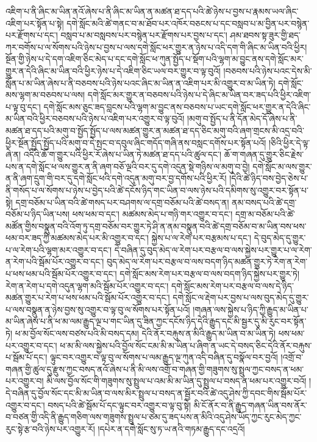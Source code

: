 འཇིག་པ་ནི་ཞིང་མ་ཡིན་ནའོ་ཞེས་པ་ནི་ཞིང་མ་ཡིན་ན་མཚན་ཐ་དད་པའི་ཚེ་ཉེས་པ་བྱས་པ་རྣམས་ཡལ་ཞིང་འཇིག་པར་སྟོན་པ་སྟེ། དགེ་སློང་མའི་ཚེ་གནང་བ་མ་ཐོབ་པར་འཁོར་བཅངས་པ་དང་བསླབ་པ་མ་བྱིན་པར་བསྙེན་པར་རྫོགས་པ་དང་། བསླབ་པ་མ་བསླབས་པར་བསྙེན་པར་རྫོགས་པར་བྱས་པ་དང་། ཤམ་ཐབས་སྟ་ཟུར་གྱི་ཐད་ཀར་བགོས་པ་ལ་སོགས་པའི་ཉེས་པ་བྱས་པ་ལས་དགེ་སློང་ཕར་གྱུར་ན་ཉེས་པ་འདི་དག་གི་ཞིང་མ་ཡིན་བའི་ཕྱིར། སྔོན་གྱི་ཉེས་པ་དེ་དག་འཇིག་ཅིང་མེད་པ་དང་དགེ་སློང་ཕ་ཀུན་སྤྱོད་པ་སྡོག་པའི་ལྷག་མ་བྱུང་ནས་དགེ་སློང་མར་གྱུར་ན་དེའི་ཞིང་མ་ཡིན་བའི་ཕྱིར་ཉེས་པ་དེ་འཇིག་ཅིང་ཡལ་བར་གྱུར་བ་ལྟ་བུའོ། །བཅབས་པའི་ཉེས་པའང་དེས་མི་སློན་པ་མ་ཡིན་ཞེས་པ་ནི་བཅབས་པའི་ཉེས་པའང་ཞིང་མ་ཡིན་ན་འཇིག་པར་མི་འགྱུར་བ་མ་ཡིན་ཏེ། དགེ་སློང་མས་ལྷག་མ་བཅབས་པ་ལས། དགེ་སློང་མར་གྱུར་ན་བཅབས་པའི་ཉེས་པ་དེ་ཞིང་མ་ཡིན་བར་ཟད་པའི་ཕྱིར་འཇིག་པ་ལྟ་བུ་དང་། དགེ་སློང་མས་ཅུང་ཟད་བླངས་པའི་ལྷག་མ་བྱུང་ནས་བཅབས་པ་ཡང་དགེ་སློང་ཕར་གྱུར་ན་དེའི་ཞིང་མ་ཡིན་བའི་ཕྱིར་བཅབས་པའི་ཉེས་པ་འཇིག་པར་འགྱུར་བ་ལྟ་བུའོ། །མགུ་བ་སྤྱོད་པ་ནི་དོན་མེད་དོ་ཞེས་པ་ནི་མཚན་ཐ་དད་པའི་མགུ་བ་སྤྱོད་སྤྱོད་པ་ལས་མཚན་གྱུར་ན་མཚན་ཐ་དད་ཅིང་མགུ་བའི་ཞག་གྲངས་མི་འདྲ་བའི་ཕྱིར་སྔོན་སྤྱོད་སྤྱོད་པའི་མགུ་བ་དེ་སྤང་བ་དབུལ་ཞིང་གདོད་གཞི་ནས་བསླང་དགོས་པར་སྟོན་པའོ། །ཅིའི་ཕྱིར་དེ་ལྟ་ཞེ་ན། འདིའི་ཆོ་ག་གྱུར་པའི་ཕྱིར་རོ་ཞེས་པ་ཡིན་ཏེ་མཚན་ཐ་དད་པའི་ཚུལ་དང་། ཆོ་ག་གཞན་དུ་གྱུར་ཅིང་རྗེས་པས་ན་དགེ་སློང་ཕ་ལས་གྱུར་ན་ནི་ཞག་བཅོ་ལྔའི་བར་དུ་དགེ་འདུན་སྡེ་གཉིས་ལ་མགུ་བ་བྱེ། དགེ་སློང་མ་ལས་གྱུར་ན་ནི་ཞག་དྲུག་གི་བར་དུ་དགེ་སློང་ཕའི་དགེ་འདུན་མགུ་བར་བྱ་དགོས་པའི་ཕྱིར་རོ། །དེའི་ཚེ་ཉིད་བས་བྱེད་ཅེས་པ་ནི་གསོད་པ་ལ་སོགས་པ་ཉེས་པ་བྱེད་པའི་ཚེ་དངོས་ཉིད་གང་ཡིན་བ་ལས་ཉེས་པའི་དམིགས་སུ་འགྱུར་བར་སྟོན་པ་སྟེ། དགྲ་བཅོམ་པ་ཡིན་བའི་ཚེ་གསད་པར་བཤགས་ལ་དགྲ་བཅོམ་པའི་ཚེ་བསད་ན། ནམ་བསད་པའི་ཚེ་དགྲ་བཅོམ་པ་ཉིད་ཡིན་པས། ཕས་ཕམ་བ་དང་། མཚམས་མེད་པ་གཉི་གར་འགྱུར་བ་དང་། དགྲ་མ་བཅོམ་པའི་ཚེ་མཚོན་གྱིས་བསྣུན་བའི་འོག་ཏུ་དགྲ་བཅོམ་བར་གྱུར་ཏེ་ཤི་ན་ནམ་བསྣུན་བའི་ཚེ་དགྲ་བཅོམ་བ་མ་ཡིན་བས་ཕས་ཕམ་བར་ཟད་ཀྱི་མཚམས་མེད་པར་མི་འགྱུར་བ་དང་། སྐྱེས་པ་ལ་རེག་པར་བརྩམས་པ་དང་། དེ་བུད་མེད་དུ་གྱུར་པ་ལ་རེག་པའི་ལྷག་མར་འགྱུར་བ་དང་། དེ་བཞིན་དུ་བུད་མེད་ལ་རེག་པར་བརྩལ་བ་ལས་སྐྱེས་པར་གྱུར་པ་ལ་རེག་ན་རེག་པའི་སྦོམ་པོར་འགྱུར་བ་དང་། བུད་མེད་ལ་རེག་པར་བརྩལ་བ་ལས་བདག་ཉིད་མཚན་གྱུར་ཏེ་རེག་ན་རེག་པ་ཕས་ཕམ་པའི་སྦོམ་པོར་འགྱུར་བ་དང་། དགེ་སློང་མས་རེག་པར་བརྩལ་བ་ལས་བདག་ཉིད་སྐྱེས་པར་གྱུར་ཏེ། རེག་ན་རེག་པ་དགེ་འདུན་ལྷག་མའི་སྦོམ་པོར་འགྱུར་བ་དང་། དགེ་སློང་མས་རེག་པར་བརྩལ་བ་ལས་དེ་ཉིད་མཚན་གྱུར་པ་རེག་པ་ཕས་ཕམ་པའི་སྦོམ་པོར་འགྱུར་བ་དང་། དགེ་སློང་ལ་རྡེག་པར་བྱས་པ་ལས་བུད་མེད་དུ་གྱུར་པ་ལས་བསྣུན་ན་ཉེས་བྱས་སུ་འགྱུར་བ་ལྟ་བུ་ལ་སོགས་པར་སྟོན་པའོ། །གཞན་ལས་སྐྱེས་པ་ཉིད་ཀྱི་རྒྱུད་མ་ཡིན་པ་མ་ཡིན་ཞེས་པ་ནི་ཕ་མ་ལམ་རྒྱུད་ལྔ་པ་གང་ཡིན་དུ་ཟིན་ཀྱང་དངོས་ཉིད་དེའི་རྒྱུད་དང་མི་སྦྱར་དུ་མི་རུང་བར་སྟོན་ཏེ། ཕ་མ་བྱོལ་སོང་ལས་བཙས་པའི་མི་བསད་དམ། དེའི་ནོར་བརྐུས་ན་མིའི་རྒྱུད་མ་ཡིན་བ་མ་ཡིན་ཏེ། ཕས་ཕམ་པར་འགྱུར་བ་དང་། ཕ་མ་མི་ལས་སྐྱེས་པའི་བྱོལ་སོང་ངམ་མི་མ་ཡིན་པ་ཞིག་ན་ཡང་དེ་བསད་ཅིང་དེའི་ནོར་བརྐུས་པ་སྦོམ་པོ་དང་། ལྟུང་བར་འགྱུར་བ་ལྟ་བུ་ལ་སོགས་པ་ལམ་རྒྱུད་ལྔ་ཀུན་འདི་བཞིན་དུ་བསྣོལ་བར་བྱའོ། །འགྲོ་བ་གཞན་གྱི་ཚུལ་དུ་རྫུས་ཀྱང་བསད་ནའོ་ཞེས་པ་ནི་མི་ལས་འགྲོ་བ་གཞན་གྱི་གཟུགས་སུ་སྤྲུལ་ཀྱང་བསད་ན་ཕམ་པར་འགྱུར་བ། མི་ལས་བྱོལ་སོང་གི་གཟུགས་སུ་སྤྲུལ་པ་འམ་མི་མ་ཡིན་དུ་སྤྲུལ་པ་བསད་ན་ཕམ་པར་འགྱུར་བའོ། །དེ་བཞིན་དུ་བྱོལ་སོང་དང་མི་མ་ཡིན་བ་ལས་མིར་སྤྲུལ་པ་བསད་ན་སྦྱོར་བའི་ཚེ་འདུ་ཤེས་ཀྱི་དབང་གིས་སྦོམ་པོར་འགྱུར་བ་དང་། བསད་པའི་ཚེ་སྦོམ་པོ་དང་ལྟུང་བར་འགྱུར་བ་ལྟ་བུ་སྟེ། མི་ངོ་ནོར་བ་ནི་རྒྱུད་གཞན་ཡིན་བས་ནོར་བ་བཙན་གྱི་འདི་ནི་རྒྱུད་གཅིག་ལས་གཟུགས་སྤྲུལ་པ་ཙམ་དུ་ཟད་པས་ན་མིའི་འདུ་ཤེས་ཡོད་ཀྱང་རུང་མེད་ཀྱང་རུང་སྟེ་རྩ་བའི་ཉེས་པར་འགྱུར་རོ། །དཔེར་ན་དགེ་སློང་སུ་ཏ་ཡ་ནའི་གཏམ་རྒྱུད་དང་འདྲའོ། 